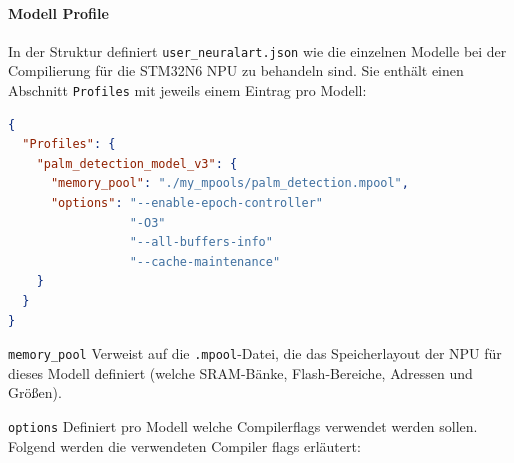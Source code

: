 \paragraph{Modell Profile}

In der Struktur definiert \texttt{user\_neuralart.json} wie die einzelnen Modelle bei der Compilierung für die STM32N6 NPU zu behandeln sind. Sie enthält einen Abschnitt \texttt{Profiles} mit jeweils einem Eintrag pro Modell:

\begin{lstlisting}[language=json, caption={Modellprofil in user\_neuralart.json}, label={lst:user-neuralart}]
{
  "Profiles": {
    "palm_detection_model_v3": {
      "memory_pool": "./my_mpools/palm_detection.mpool",
      "options": "--enable-epoch-controller"
                 "-O3"
                 "--all-buffers-info"
                 "--cache-maintenance"
    }
  }
}
\end{lstlisting}

\texttt{memory\_pool} \newline
Verweist auf die \texttt{.mpool}-Datei, die das Speicherlayout der NPU für dieses Modell definiert (welche SRAM-Bänke, Flash-Bereiche, Adressen und Größen).

\texttt{options} \newline
Definiert pro Modell welche Compilerflags verwendet werden sollen. Folgend werden die verwendeten Compiler flags erläutert:

